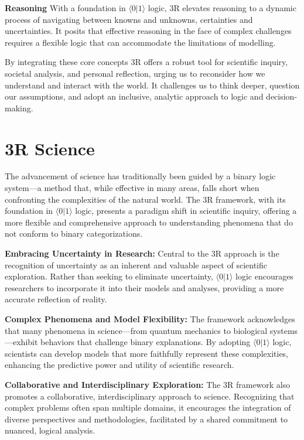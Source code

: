 \documentclass[12pt]{article}
\newcommand{\qbit}{\ensuremath{\langle 0 | 1 \rangle}}
\begin{document}
\textbf{Reasoning}
With a foundation in \qbit{} logic, 3R elevates reasoning to a dynamic process of navigating between knowns and unknowns, certainties and uncertainties. It posits that effective reasoning in the face of complex challenges requires a flexible logic that can accommodate the limitations of modelling.

By integrating these core concepts 3R offers a robust tool for scientific inquiry, societal analysis, and personal reflection, urging us to reconsider how we understand and interact with the world. It challenges us to think deeper, question our assumptions, and adopt an inclusive, analytic approach to logic and decision-making.

\section*{3R Science}

The advancement of science has traditionally been guided by a binary logic system—a method that, while effective in many areas, falls short when confronting the complexities of the natural world. The 3R framework, with its foundation in \qbit{} logic, presents a paradigm shift in scientific inquiry, offering a more flexible and comprehensive approach to understanding phenomena that do not conform to binary categorizations.

\textbf{Embracing Uncertainty in Research:} Central to the 3R approach is the recognition of uncertainty as an inherent and valuable aspect of scientific exploration. Rather than seeking to eliminate uncertainty, \qbit{} logic encourages researchers to incorporate it into their models and analyses, providing a more accurate reflection of reality.

\textbf{Complex Phenomena and Model Flexibility:} The framework acknowledges that many phenomena in science—from quantum mechanics to biological systems—exhibit behaviors that challenge binary explanations. By adopting \qbit{} logic, scientists can develop models that more faithfully represent these complexities, enhancing the predictive power and utility of scientific research.

\textbf{Collaborative and Interdisciplinary Exploration:} The 3R framework also promotes a collaborative, interdisciplinary approach to science. Recognizing that complex problems often span multiple domains, it encourages the integration of diverse perspectives and methodologies, facilitated by a shared commitment to nuanced, logical analysis.
\end{document}
